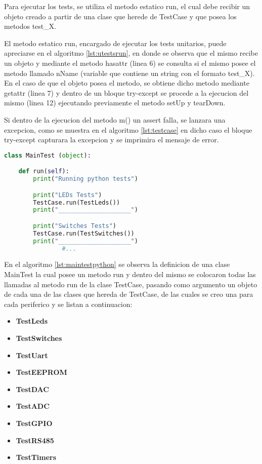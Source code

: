 Para ejecutar los tests, se utiliza el metodo estatico run, el cual debe recibir un objeto creado a partir de una clase que herede de TestCase y que posea los metodos test\_X.

El metodo estatico run, encargado de ejecutar los tests unitarios, puede apreciarse en el algoritmo \ref{lst:utestsrun}, en donde se observa que el mismo recibe un objeto y mediante el metodo hasattr (linea 6) se consulta si el mismo posee el metodo llamado nName (variable que contiene un string con el formato test\_X). En el caso de que el objeto posea el metodo, se obtiene dicho metodo mediante getattr (linea 7) y dentro de un bloque try-except se procede a la ejecucion del mismo (linea 12) ejecutando previamente el metodo setUp y tearDown.

Si dentro de la ejecucion del metodo m() un assert falla, se lanzara una excepcion, como se muestra en el algoritmo \ref{lst:testcase} en dicho caso el bloque try-except capturara la excepcion y se imprimira el mensaje de error.

\begin{lstlisting}[label={lst:maintestpython},caption=Clase MainTest desde donde se ejecutan todos los tests Python., language={python}]
class MainTest (object):

    def run(self):
        print("Running python tests")

        print("LEDs Tests")
        TestCase.run(TestLeds())
        print("____________________")

        print("Switches Tests")
        TestCase.run(TestSwitches())
        print("____________________")
				#...

\end{lstlisting}
 
En el algoritmo \ref{lst:maintestpython} se observa la definicion de una clase MainTest la cual posee un metodo run y dentro del mismo se colocaron todas las llamadas al metodo run de la clase TestCase, pasando como argumento un objeto de cada una de las clases que hereda de TestCase, de las cuales se creo una para cada periferico y se listan a continuacion:

\begin{itemize}
	\item \textbf{TestLeds}
	\item \textbf{TestSwitches}
	\item \textbf{TestUart}
	\item \textbf{TestEEPROM}
	\item \textbf{TestDAC}
	\item \textbf{TestADC}
	\item \textbf{TestGPIO}
	\item \textbf{TestRS485}	
	\item \textbf{TestTimers}
\end{itemize}

